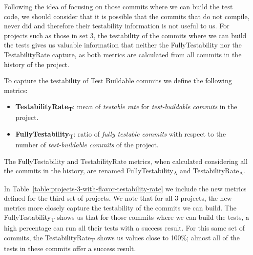 Following the idea of focusing on those commits where we can build the test code, we should consider that it is possible that the commits that do not compile, never did and therefore their testability information is not useful to us.
For projects such as those in set 3, the testability of the commits where we can build the tests gives us valuable information that neither the FullyTestability nor the TestabilityRate capture, as both metrics are calculated from all commits in the history of the project.

To capture the testability of Test Buildable commits we define the following metrics:
\begin{itemize}
    \item \textbf{TestabilityRate\textsubscript{T}}: mean of \textit{testable rate} for \textit{test-buildable commits} in the project.
    \item \textbf{FullyTestability\textsubscript{T}}: ratio of \textit{fully testable commits} with respect to the number of \textit{test-buildable commits} of the project.
\end{itemize}
The FullyTestability and TestabilityRate metrics, when calculated considering all the commits in the history, are renamed FullyTestability\textsubscript{A} and TestabilityRate\textsubscript{A}.

In Table~\ref{table:projects-3-with-flavor-testability-rate} we include the new metrics defined for the third set of projects. 
We note that for all 3 projects, the new metrics more closely capture the testability of the commits we can build.
The FullyTestability\textsubscript{T} shows us that for those commits where we can build the tests, a high percentage can run all their tests with a success result. For this same set of commits, the TestabilityRate\textsubscript{T} shows us values close to 100\%; almost all of the tests in these commits offer a success result.

